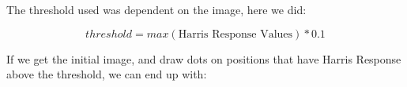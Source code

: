 \documentclass[11pt, oneside]{article}   	%
\begin{document}
The threshold used was dependent on the image, here we did:

\begin{equation*}
threshold = max(\text{Harris Response Values}) * 0.1
\end{equation*}

If we get the initial image, and draw dots on positions that have Harris Response above the threshold, we can end up with:

\begin{figure}[H]
  \noindent{}
\end{figure}
\end{document}
